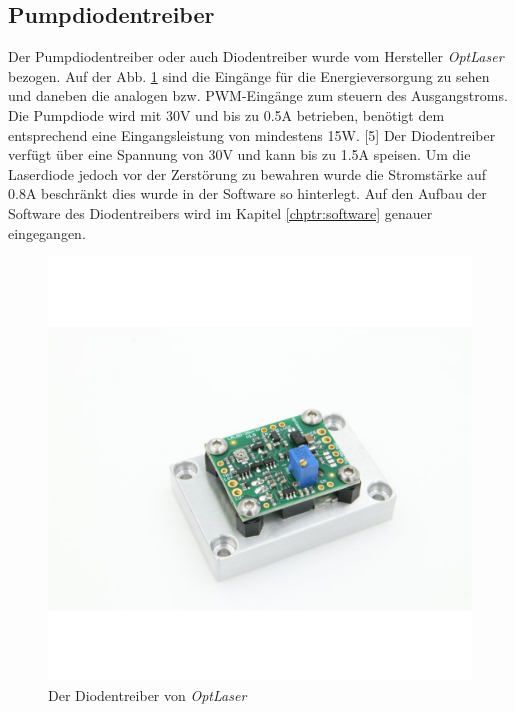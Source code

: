 \subsection{Pumpdiodentreiber}
\label{chptr:_diodentreiber}
Der Pumpdiodentreiber oder auch Diodentreiber wurde vom Hersteller \textit{OptLaser} bezogen. Auf der Abb. \ref{fig:diodentreiber_hw} sind die Eingänge für die Energieversorgung zu sehen und daneben die analogen bzw. PWM-Eingänge zum steuern des Ausgangstroms. Die Pumpdiode wird mit 30V und bis zu 0.5A betrieben, benötigt dem entsprechend eine Eingangsleistung von mindestens 15W. [5] Der Diodentreiber verfügt über eine Spannung von 30V und kann bis zu 1.5A speisen. Um die Laserdiode jedoch vor der Zerstörung zu bewahren wurde die Stromstärke auf 0.8A beschränkt dies wurde in der Software so hinterlegt. Auf den Aufbau der Software des Diodentreibers wird im Kapitel \ref{chptr:software} genauer eingegangen.

\begin{figure}[H]
    \centering
    \includegraphics[scale=1, trim={25mm 20mm 15mm 30mm}, clip]{98_images/ldd_optlaser.jpg}
    \caption{Der Diodentreiber von \textit{OptLaser}}
    \label{fig:diodentreiber_hw}
\end{figure}

